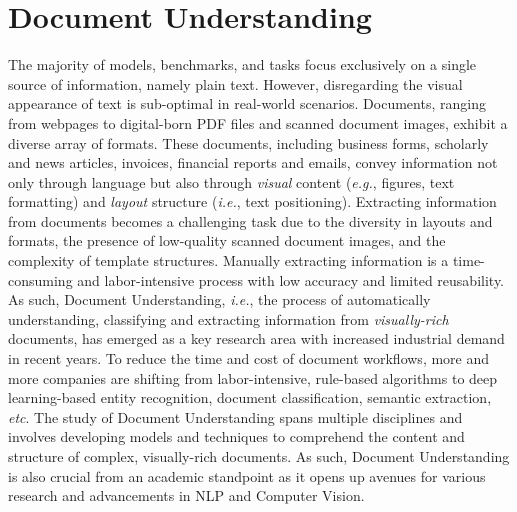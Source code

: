 \section{Document Understanding}

The majority of models, benchmarks, and tasks focus exclusively on a single source of information, namely plain text. However, disregarding the visual appearance of text is sub-optimal in real-world scenarios. Documents, ranging from webpages to digital-born PDF files and scanned document images, exhibit a diverse array of formats. These documents, including business forms, scholarly and news articles, invoices, financial reports and emails, convey information not only through language but also through \textit{visual} content (\textit{e.g.}, figures, text formatting) and \textit{layout} structure (\textit{i.e.}, text positioning). Extracting information from documents becomes a challenging task due to the diversity in layouts and formats, the presence of low-quality scanned document images, and the complexity of template structures. Manually extracting information is a time-consuming and labor-intensive process with low accuracy
and limited reusability. As such, Document Understanding, \textit{i.e.}, the process of automatically understanding, classifying and extracting information from \textit{visually-rich} documents, has emerged as a key research area with increased industrial demand in recent years. To reduce the time and cost of document workflows, more and more companies are shifting from labor-intensive, rule-based algorithms to deep learning-based entity recognition, document classification, semantic extraction, \textit{etc}. The study of Document Understanding spans multiple disciplines and involves developing models and techniques to comprehend the content and structure of complex, visually-rich documents. As such, Document Understanding is also crucial from an academic standpoint as it opens up avenues for various research and advancements in \ac{NLP} and Computer Vision. 

